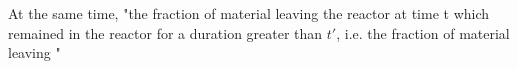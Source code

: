 At the same time, "the fraction of material leaving the reactor at time t which remained in the reactor for a duration greater than $t'$, i.e. the fraction of material leaving "  